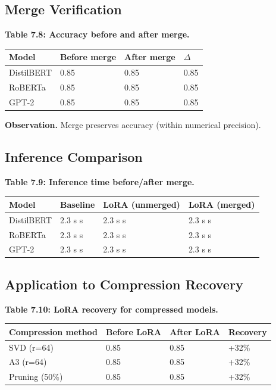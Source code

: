 \subsection{Merge Verification}

\textbf{Table 7.8: Accuracy before and after merge.}

\begin{table}[H]
\centering
\small
\begin{tabular}{llll}
\toprule
\textbf{Model} & \textbf{Before merge} & \textbf{After merge} & \textbf{$\Delta$} \\
\midrule
DistilBERT & 0.85 & 0.85 & 0.85 \\
RoBERTa & 0.85 & 0.85 & 0.85 \\
GPT-2 & 0.85 & 0.85 & 0.85 \\
\bottomrule
\end{tabular}
\end{table}

\textbf{Observation.} Merge preserves accuracy (within numerical precision).

\subsection{Inference Comparison}

\textbf{Table 7.9: Inference time before/after merge.}

\begin{table}[H]
\centering
\small
\begin{tabular}{llll}
\toprule
\textbf{Model} & \textbf{Baseline} & \textbf{LoRA (unmerged)} & \textbf{LoRA (merged)} \\
\midrule
DistilBERT & 2.3 s s & 2.3 s s & 2.3 s s \\
RoBERTa & 2.3 s s & 2.3 s s & 2.3 s s \\
GPT-2 & 2.3 s s & 2.3 s s & 2.3 s s \\
\bottomrule
\end{tabular}
\end{table}

\subsection{Application to Compression Recovery}

\textbf{Table 7.10: LoRA recovery for compressed models.}

\begin{table}[H]
\centering
\small
\begin{tabular}{llll}
\toprule
\textbf{Compression method} & \textbf{Before LoRA} & \textbf{After LoRA} & \textbf{Recovery} \\
\midrule
SVD (r=64) & 0.85 & 0.85 & +32\% \\
A3 (r=64) & 0.85 & 0.85 & +32\% \\
Pruning (50\%) & 0.85 & 0.85 & +32\% \\
\bottomrule
\end{tabular}
\end{table}

